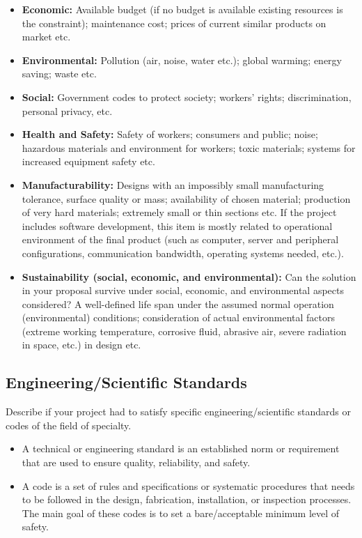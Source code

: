 \documentclass[12pt,a4paper]{article}
\begin{document}
\begin{itemize}[leftmargin=1.5em]
    \item \textbf{Economic:} Available budget (if no budget is available existing resources is the constraint); maintenance cost; prices of current similar products on market etc.
    \item \textbf{Environmental:} Pollution (air, noise, water etc.); global warming; energy saving; waste etc.
    \item \textbf{Social:} Government codes to protect society; workers’ rights; discrimination, personal privacy, etc.
    \item \textbf{Health and Safety:} Safety of workers; consumers and public; noise; hazardous materials and environment for workers; toxic materials; systems for increased equipment safety etc.
    \item \textbf{Manufacturability:} Designs with an impossibly small manufacturing tolerance, surface quality or mass; availability of chosen material; production of very hard materials; extremely small or thin sections etc. If the project includes software development, this item is mostly related to operational environment of the final product (such as computer, server and peripheral configurations, communication bandwidth, operating systems needed, etc.).
    \item \textbf{Sustainability (social, economic, and environmental):} Can the solution in your proposal survive under social, economic, and environmental aspects considered? A well-defined life span under the assumed normal operation (environmental) conditions; consideration of actual environmental factors (extreme working temperature, corrosive fluid, abrasive air, severe radiation in space, etc.) in design etc.
\end{itemize}

\subsection{Engineering/Scientific Standards}
Describe if your project had to satisfy specific engineering/scientific standards or codes of the field of specialty.

\begin{itemize}[leftmargin=1.5em]
    \item A technical or engineering standard is an established norm or requirement that are used to ensure quality, reliability, and safety.
    \item A code is a set of rules and specifications or systematic procedures that needs to be followed in the design, fabrication, installation, or inspection processes. The main goal of these codes is to set a bare/acceptable minimum level of safety.
\end{itemize}
\end{document}
